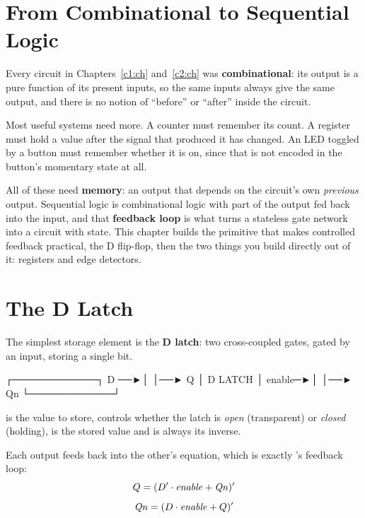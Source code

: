%

\section{From Combinational to Sequential Logic}
\label{c3:a1}
Every circuit in Chapters~\ref{c1:ch} and~\ref{c2:ch} was \textbf{combinational}: its output is a
pure function of its present inputs, so the same inputs always give the same output, and there is
no notion of ``before'' or ``after'' inside the circuit.

Most useful systems need more. A counter must remember its count. A register must hold a value after
the signal that produced it has changed. An LED toggled by a button must remember whether it is on,
since that is not encoded in the button's momentary state at all.

All of these need \textbf{memory}: an output that depends on the circuit's own \emph{previous}
output. Sequential logic is combinational logic with part of the output fed back into the input, and
that \textbf{feedback loop} is what turns a stateless gate network into a circuit with state. This
chapter builds the primitive that makes controlled feedback practical, the D flip-flop, then the two
things you build directly out of it: registers and edge detectors.

\section{The D Latch}
\label{c3:a2}
The simplest storage element is the \textbf{D latch}: two cross-coupled gates, gated by an
 input, storing a single bit.

\begin{textdrawing}
        ┌────────────┐
   D ──►│            │──► Q
        │  D LATCH   │
enable─►│            │──► Qn
        └────────────┘
\end{textdrawing}

\noindent{} is the value to store,  controls whether the latch is \emph{open}
(transparent) or \emph{closed} (holding),  is the stored value and  is always its
inverse.

Each output feeds back into the other's equation, which is exactly 's feedback loop:
\[ Q = (D' \cdot \mathit{enable} + \mathit{Qn})' \]
\[ \mathit{Qn} = (D \cdot \mathit{enable} + Q)' \]

